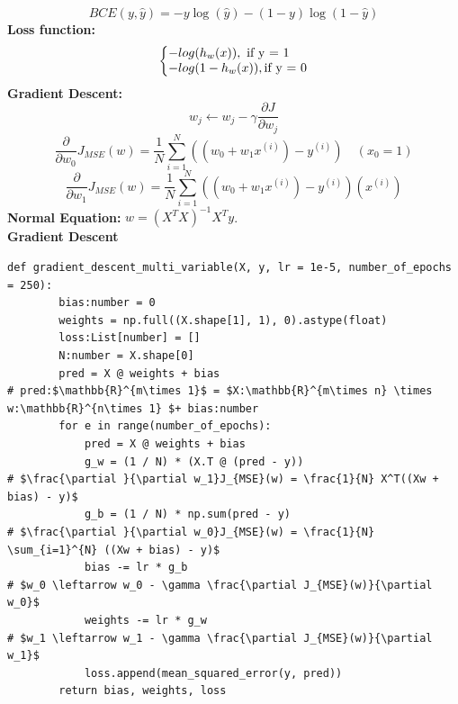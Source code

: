 \documentclass[8pt,twocolumn]{article}
\makeatletter
\newenvironment{system}%
{\left\lbrace\begin{array}{@{}l@{}}}%
{\end{array}\right.}
\makeatother
\begin{document}
\begin{equation}
    BCE(y, \hat{y}) = -y\log(\hat{y}) - (1 - y)\log(1 - \hat{y})
\end{equation}
\textbf{Loss function:}
\begin{equation}
    \begin{system}
    -log(h_w(x)), \text{ if y = 1}\\
    -log(1 - h_w(x)), \text{if y = 0}
    \end{system}
\end{equation}
\textbf{Gradient Descent:}
\begin{equation}
    w_j \leftarrow w_j - \gamma \frac{\partial J}{\partial w_j}
\end{equation}
    \[\frac{\partial }{\partial w_0} J_{MSE}(w)= \frac{1}{N} \sum_{i=1}^{N}((w_0 + w_1 x^{(i)}) - y^{(i)}) \quad {(x_0 = 1)}\]
    \[\frac{\partial }{\partial w_1} J_{MSE}(w)= \frac{1}{N} \sum_{i=1}^{N}((w_0 + w_1 x^{(i)}) - y^{(i)})(x^{(i)})\]
\textbf{Normal Equation:} $w = (X^TX)^{-1}X^Ty$.\\
\textbf{Gradient Descent}\vspace{-0.6em}
\begin{lstlisting}[mathescape=true]
    def gradient_descent_multi_variable(X, y, lr = 1e-5, number_of_epochs = 250):
        bias:number = 0
        weights = np.full((X.shape[1], 1), 0).astype(float)
        loss:List[number] = []
        N:number = X.shape[0]  
        pred = X @ weights + bias       
# pred:$\mathbb{R}^{m\times 1}$ = $X:\mathbb{R}^{m\times n} \times w:\mathbb{R}^{n\times 1} $+ bias:number
        for e in range(number_of_epochs): 
            pred = X @ weights + bias
            g_w = (1 / N) * (X.T @ (pred - y)) 
# $\frac{\partial }{\partial w_1}J_{MSE}(w) = \frac{1}{N} X^T((Xw + bias) - y)$
            g_b = (1 / N) * np.sum(pred - y)   
# $\frac{\partial }{\partial w_0}J_{MSE}(w) = \frac{1}{N} \sum_{i=1}^{N} ((Xw + bias) - y)$
            bias -= lr * g_b                   
# $w_0 \leftarrow w_0 - \gamma \frac{\partial J_{MSE}(w)}{\partial w_0}$
            weights -= lr * g_w                
# $w_1 \leftarrow w_1 - \gamma \frac{\partial J_{MSE}(w)}{\partial w_1}$
            loss.append(mean_squared_error(y, pred))
        return bias, weights, loss  
    \end{lstlisting}
\vspace{-1.2em}
\end{document}

